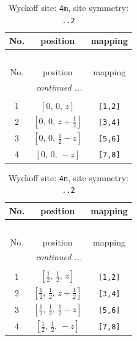 \documentclass[fleqn,8pt]{jsarticle}
\begin{document}
\renewcommand{\arraystretch}{1.2}
\begin{longtable}{ccc}
\caption{Wyckoff site: {\tt 4m}, site symmetry: {\tt ..2}}
 \\
 \hline \hline
No. & position & mapping \\ \hline \endfirsthead

\multicolumn{2}{l}{\tablename\ \thetable{}} \\
 \hline \hline
No. & position & mapping \\ \hline \endhead

 \hline \hline
\multicolumn{2}{r}{\footnotesize\it continued ...} \\ \endfoot

 \hline \hline
\multicolumn{2}{r}{} \\ \endlastfoot

1 & $\left[ 0,\, 0,\, z \right]$ & {\tt [1,2]} \\ \hline
2 & $\left[ 0,\, 0,\, z + \frac{1}{2} \right]$ & {\tt [3,4]} \\ \hline
3 & $\left[ 0,\, 0,\, \frac{1}{2} - z \right]$ & {\tt [5,6]} \\ \hline
4 & $\left[ 0,\, 0,\, - z \right]$ & {\tt [7,8]} \\
\end{longtable}
\renewcommand{\arraystretch}{1.2}
\begin{longtable}{ccc}
\caption{Wyckoff site: {\tt 4n}, site symmetry: {\tt ..2}}
 \\
 \hline \hline
No. & position & mapping \\ \hline \endfirsthead

\multicolumn{2}{l}{\tablename\ \thetable{}} \\
 \hline \hline
No. & position & mapping \\ \hline \endhead

 \hline \hline
\multicolumn{2}{r}{\footnotesize\it continued ...} \\ \endfoot

 \hline \hline
\multicolumn{2}{r}{} \\ \endlastfoot

1 & $\left[ \frac{1}{2},\, \frac{1}{2},\, z \right]$ & {\tt [1,2]} \\ \hline
2 & $\left[ \frac{1}{2},\, \frac{1}{2},\, z + \frac{1}{2} \right]$ & {\tt [3,4]} \\ \hline
3 & $\left[ \frac{1}{2},\, \frac{1}{2},\, \frac{1}{2} - z \right]$ & {\tt [5,6]} \\ \hline
4 & $\left[ \frac{1}{2},\, \frac{1}{2},\, - z \right]$ & {\tt [7,8]} \\
\end{longtable}
\end{document}
